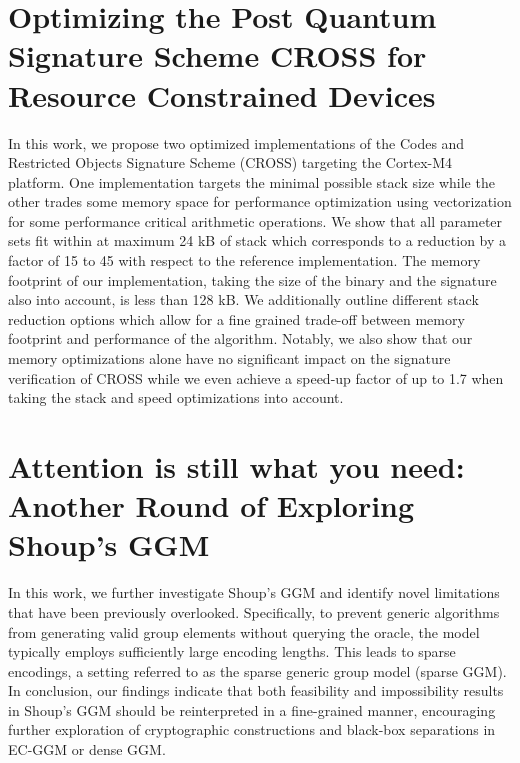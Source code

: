 \documentclass[11pt,oneside]{book}
\theoremstyle{definition}
\theoremstyle{remark}
\theoremstyle{plain}
\begin{document}
\section{\cite{cryptoeprint:2025/1928} Optimizing the Post Quantum Signature Scheme CROSS for Resource Constrained Devices}
In this work, we propose two optimized implementations of the Codes and Restricted Objects Signature Scheme (CROSS) targeting the Cortex-M4 platform. One implementation targets the minimal possible stack size while the other trades some memory space for performance optimization using vectorization for some performance critical arithmetic operations. We show that all parameter sets fit within at maximum 24 kB of stack which corresponds to a reduction by a factor of 15 to 45 with respect to the reference implementation. The memory footprint of our implementation, taking the size of the binary and the signature also into account, is less than 128 kB. We additionally outline different stack reduction options which allow for a fine grained trade-off between memory footprint and performance of the algorithm. Notably, we also show that our memory optimizations alone have no significant impact on the signature verification of CROSS while we even achieve a speed-up factor of up to 1.7 when taking the stack and speed optimizations into account.
\section{\cite{cryptoeprint:2025/1930} Attention is still what you need: Another Round of Exploring Shoup’s GGM
}
In this work, we further investigate Shoup's GGM and identify novel limitations that have been previously overlooked. Specifically, to prevent generic algorithms from generating valid group elements without querying the oracle, the model typically employs sufficiently large encoding lengths. This leads to sparse encodings, a setting referred to as the sparse generic group model (sparse GGM). 
In conclusion, our findings indicate that both feasibility and impossibility results in Shoup's GGM should be reinterpreted in a fine-grained manner, encouraging further exploration of cryptographic constructions and black-box separations in EC-GGM or dense GGM.
\end{document}
